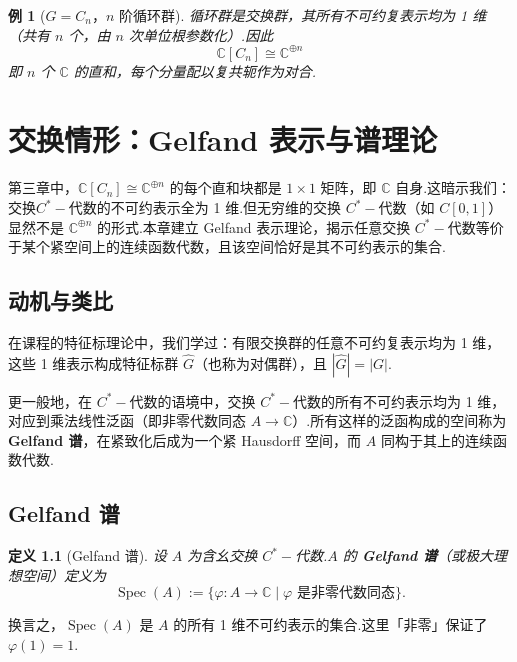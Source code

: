 \documentclass[math-font=lm, text-font=lm, math-style=TeX]{sjtureport}
\newtheorem{definition}{定义}[chapter]
\newtheorem{example}{例}[chapter]
\theoremstyle{plain}
\theoremstyle{plain}
\DeclareMathOperator{\Spec}{Spec}
\begin{document}
\begin{example}[$G = C_n$，$n$ 阶循环群]
    循环群是交换群，其所有不可约复表示均为 1 维（共有 $n$ 个，由 $n$ 次单位根参数化）.因此
    \begin{equation}
        \mathbb{C}[C_n] \cong \mathbb{C}^{\oplus n}
    \end{equation}
    即 $n$ 个 $\mathbb{C}$ 的直和，每个分量配以复共轭作为对合.
\end{example}

\chapter{交换情形：Gelfand 表示与谱理论}

第三章中，$\mathbb{C}[C_n] \cong \mathbb{C}^{\oplus n}$ 的每个直和块都是 $1 \times 1$ 矩阵，即 $\mathbb{C}$ 自身.这暗示我们：交换$C^*-\!$代数的不可约表示全为 1 维.但无穷维的交换 $C^*-\!$代数（如 $C[0,1]$）显然不是 $\mathbb{C}^{\oplus n}$ 的形式.本章建立 Gelfand 表示理论，揭示任意交换 $C^*-\!$代数等价于某个紧空间上的连续函数代数，且该空间恰好是其不可约表示的集合.

\section{动机与类比}

在课程的特征标理论中，我们学过：有限交换群的任意不可约复表示均为 1 维，这些 1 维表示构成特征标群 $\widehat{G}$（也称为对偶群），且 $|\widehat{G}| = |G|$.

更一般地，在 $C^*-\!$代数的语境中，交换 $C^*-\!$代数的所有不可约表示均为 1 维，对应到乘法线性泛函（即非零代数同态 $A \to \mathbb{C}$）.所有这样的泛函构成的空间称为\textbf{Gelfand 谱}，在紧致化后成为一个紧 Hausdorff 空间，而 $A$ 同构于其上的连续函数代数.

\section{Gelfand 谱}

\begin{definition}[Gelfand 谱]
    设 $A$ 为含幺交换 $C^*-\!$代数.$A$ 的 \textbf{Gelfand 谱}（或极大理想空间）定义为
    \begin{equation}
        \Spec(A) := \{\varphi: A \to \mathbb{C} \mid \varphi \text{ 是非零代数同态}\}.
    \end{equation}
\end{definition}

换言之，$\Spec(A)$ 是 $A$ 的所有 1 维不可约表示的集合.这里「非零」保证了 $\varphi(1) = 1$.\par
\end{document}
